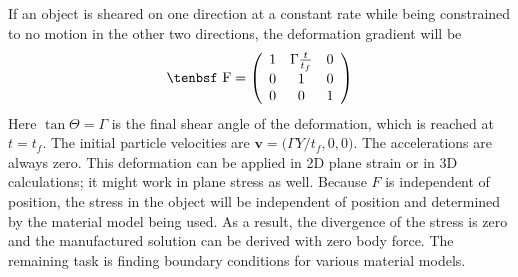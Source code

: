\documentclass[11pt]{book}
\renewcommand{\vec}[1]{\boldsymbol{#1}}
\def\F{\hbox{\tenbsf F}}
\begin{document}
If an object is sheared on one direction at a constant rate while being constrained to no motion in the other two directions, the deformation gradient will be
\begin{equation}
    \F = \left(\begin{array}{ccc} 1 & \Gamma{t\over t_f} & 0 \\
               0 & 1 & 0 \\
               0 & 0 & 1 \end{array} \right)
\end{equation}
Here $\tan\Theta = \Gamma$ is the final shear angle of the deformation, which is reached at $t=t_f$. The initial particle velocities are $\vec v = \bigl(\Gamma Y/t_f,0,0\bigr)$. The accelerations are always zero. This deformation can be applied in 2D plane strain or in 3D calculations; it might work in plane stress as well. Because $F$ is independent of position, the stress in the object will be independent of position and determined by the material model being used. As a result, the divergence of the stress is zero and the manufactured solution can be derived with zero body force. The remaining task is finding boundary conditions for various material models.
\end{document}
